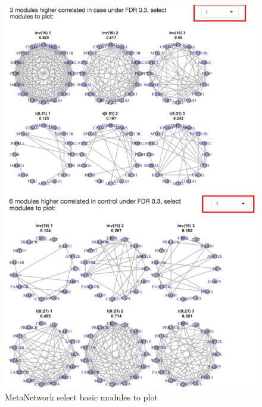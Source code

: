 \begin{figure}[H]
\begin{center}
\includegraphics[scale=0.7]{./figure/MetaNetwork/MetaNetworkBMplot.png}
\caption{MetaNetwork select basic modules to plot}
\label{fig:MetaNetworkBMplot}
\end{center}
\end{figure}
